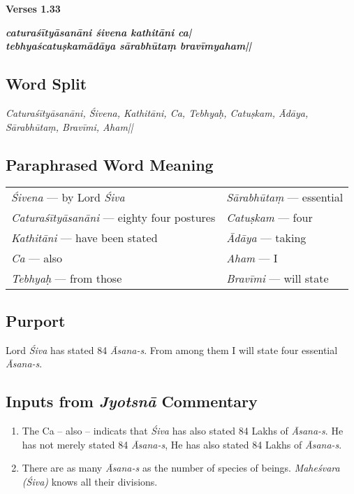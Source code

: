 \noindent 
\textbf{Verses 1.33}

\begin{shloka}
\textit{\textbf{caturaśītyāsanāni śivena kathitāni ca|}\\
\textbf{tebhyaścatuṣkamādāya sārabhūtaṃ bravīmyaham||}}
\end{shloka}

\subsection*{Word Split}

\textit{Caturaśītyāsanāni, Śivena, Kathitāni, Ca, Tebhyaḥ, Catuṣkam, Ādāya, Sārabhūtaṃ, Bravīmi, Aham||}

\subsection*{Paraphrased Word Meaning}

\begin{longtable}{>{\noindent\raggedright}p{5cm}>{\noindent\raggedright}p{5cm}}
\textit{Śivena} --- by Lord \textit{Śiva} & \textit{Sārabhūtaṃ} --- essential\tabularnewline
\textit{Caturaśītyāsanāni} --- eighty four postures  & \textit{Catuṣkam} --- four\tabularnewline
\textit{Kathitāni} --- have been stated  & \textit{Ādāya} --- taking\tabularnewline
\textit{Ca} --- also & \textit{Aham}  --- I\tabularnewline
\textit{Tebhyaḥ} --- from those & \textit{Bravīmi} --- will state
\end{longtable}

\subsection*{Purport}

Lord \textit{Śiva} has stated 84 \textit{Āsana-s}. From among them I will state four essential \textit{Āsana-s}.

\subsection*{Inputs from \textit{Jyotsnā} Commentary}

\begin{enumerate}
\item The Ca – also – indicats that \textit{Śiva} has also stated 84 Lakhs of \textit{Āsana-s}. He has not merely stated 84 \textit{Āsana-s}, He has also stated 84 Lakhs of \textit{Āsana-s}. 
\item There are as many \textit{Āsana-s} as the number of species of beings. \textit{Maheśvara (Śiva)} knows all their divisions. 
\end{enumerate}

